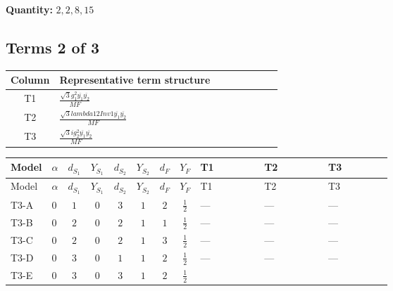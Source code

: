 \documentclass[8pt]{article}
\begin{document}
\begin{landscape}
\begin{longtable}{@{}llcccccc >{\raggedright\arraybackslash}p{0.21\linewidth} >{\raggedright\arraybackslash}p{0.21\linewidth} >{\raggedright\arraybackslash}p{0.21\linewidth}@{}}
\midrule
\bottomrule
\end{longtable}
\clearpage
\noindent\textbf{Quantity: }$\mathrm{2,2,8,15}$\par\smallskip
\subsection*{Terms 2 of 3}
\begin{center}
\begin{tabular}{@{}c >{\raggedright\arraybackslash}p{0.82\linewidth}@{}}
\toprule
Column & Representative term structure \\
\midrule
T1 & \(\displaystyle \frac{\sqrt{3} g_{1}^{2} \overline{y_{1}} \overline{y_{2}}}{MF}\) \\
\midrule
T2 & \(\displaystyle \frac{\sqrt{3} lambda12Inv1 \overline{y_{1}} \overline{y_{2}}}{MF}\) \\
\midrule
T3 & \(\displaystyle \frac{\sqrt{3} i g_{2}^{2} \overline{y_{1}} \overline{y_{2}}}{MF}\) \\
\midrule
\bottomrule
\end{tabular}
\end{center}
\smallskip
\tiny
\begin{longtable}{@{}llcccccc >{\raggedright\arraybackslash}p{0.21\linewidth} >{\raggedright\arraybackslash}p{0.21\linewidth} >{\raggedright\arraybackslash}p{0.21\linewidth}@{}}
\toprule
Model & $\alpha$ & $d_{S_1}$ & $Y_{S_1}$ & $d_{S_2}$ & $Y_{S_2}$ & $d_F$ & $Y_F$ & T1 & T2 & T3 \\
\midrule
\endfirsthead
\toprule
Model & $\alpha$ & $d_{S_1}$ & $Y_{S_1}$ & $d_{S_2}$ & $Y_{S_2}$ & $d_F$ & $Y_F$ & T1 & T2 & T3 \\
\midrule
\endhead
T3-A & $0$ & $1$ & $0$ & $3$ & $1$ & $2$ & $\frac{1}{2}$ & --- & --- & --- \\
\midrule
T3-B & $0$ & $2$ & $0$ & $2$ & $1$ & $1$ & $\frac{1}{2}$ & --- & --- & --- \\
\midrule
T3-C & $0$ & $2$ & $0$ & $2$ & $1$ & $3$ & $\frac{1}{2}$ & --- & --- & --- \\
\midrule
T3-D & $0$ & $3$ & $0$ & $1$ & $1$ & $2$ & $\frac{1}{2}$ & --- & --- & --- \\
\midrule
T3-E & $0$ & $3$ & $0$ & $3$ & $1$ & $2$ & $\frac{1}{2}$ & \scriptsize\adjustbox{max width=\linewidth}{$\begin{gathered} - \frac{\sqrt{3} g_{1}^{2} \overline{y_{1}} \overline{y_{2}}}{8 MF}\end{gathered}$} & \scriptsize\adjustbox{max width=\linewidth}{$\begin{gathered} \frac{\sqrt{3} lambda12Inv1 \overline{y_{1}} \overline{y_{2}}}{6 MF}\end{gathered}$} & \scriptsize\adjustbox{max width=\linewidth}{$\begin{gathered} - \frac{\sqrt{3} i g_{2}^{2} \overline{y_{1}} \overline{y_{2}}}{6 MF}\end{gathered}$} \\

\end{longtable}
\end{landscape}
\end{document}
